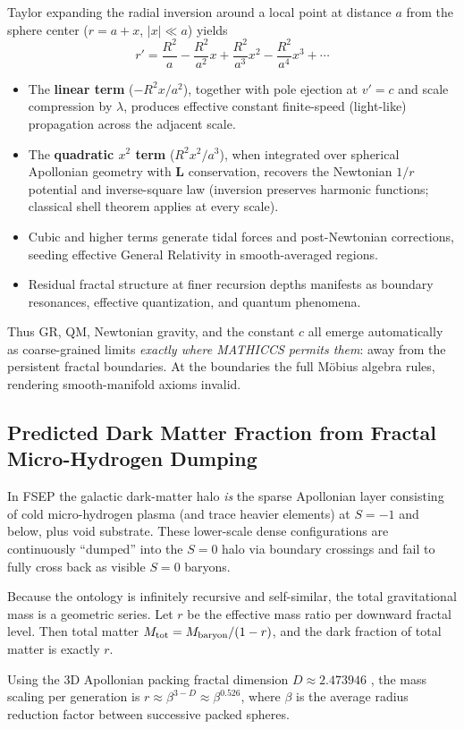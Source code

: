 \documentclass[11pt,a4paper]{article}
\begin{document}
Taylor expanding the radial inversion around a local point at distance $a$ from the sphere center ($r = a + x$, $|x|\ll a$) yields
\[
r' = \frac{R^2}{a} - \frac{R^2}{a^2}x + \frac{R^2}{a^3}x^2 - \frac{R^2}{a^4}x^3 + \cdots
\]
\begin{itemize}
\item The \textbf{linear term} ($-R^2 x/a^2$), together with pole ejection at $v'=c$ and scale compression by $\lambda$, produces effective constant finite-speed (light-like) propagation across the adjacent scale.
\item The \textbf{quadratic $x^2$ term} ($R^2 x^2 / a^3$), when integrated over spherical Apollonian geometry with $\mathbf{L}$ conservation, recovers the Newtonian $1/r$ potential and inverse-square law (inversion preserves harmonic functions; classical shell theorem applies at every scale).
\item Cubic and higher terms generate tidal forces and post-Newtonian corrections, seeding effective General Relativity in smooth-averaged regions.
\item Residual fractal structure at finer recursion depths manifests as boundary resonances, effective quantization, and quantum phenomena.
\end{itemize}
Thus GR, QM, Newtonian gravity, and the constant $c$ all emerge automatically as coarse-grained limits \emph{exactly where MATHICCS permits them}: away from the persistent fractal boundaries. At the boundaries the full M\"obius algebra rules, rendering smooth-manifold axioms invalid.

\subsection{Predicted Dark Matter Fraction from Fractal Micro-Hydrogen Dumping}
In FSEP the galactic dark-matter halo \emph{is} the sparse Apollonian layer consisting of cold micro-hydrogen plasma (and trace heavier elements) at $S=-1$ and below, plus void substrate. These lower-scale dense configurations are continuously ``dumped'' into the $S=0$ halo via boundary crossings and fail to fully cross back as visible $S=0$ baryons.

Because the ontology is infinitely recursive and self-similar, the total gravitational mass is a geometric series. Let $r$ be the effective mass ratio per downward fractal level. Then total matter $M_{\rm tot} = M_{\rm baryon} / (1-r)$, and the dark fraction of total matter is exactly $r$.

Using the 3D Apollonian packing fractal dimension $D\approx 2.473946$ \cite{borkovec1994}, the mass scaling per generation is $r \approx \beta^{3-D} \approx \beta^{0.526}$, where $\beta$ is the average radius reduction factor between successive packed spheres.
\end{document}
